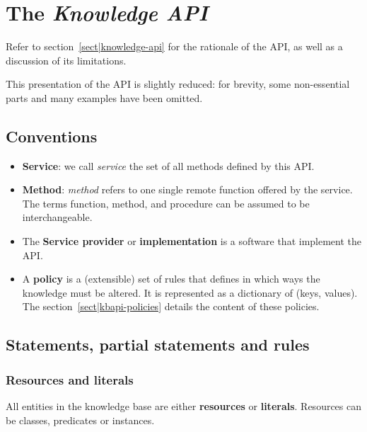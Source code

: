\chapter{The \emph{Knowledge API}}
\label{chapter|kb-api}

Refer to section~\ref{sect|knowledge-api} for the rationale of the API, as well
as a discussion of its limitations.

This presentation of the API is slightly reduced: for brevity, some
non-essential parts and many examples have been omitted.

\section{Conventions}

\begin{itemize}

    \item  \textbf{Service}: we call \emph{service} the set of all methods
    defined by this API.

    \item  \textbf{Method}: \emph{method} refers to one single remote function
    offered by the service. The terms function, method, and procedure can be
    assumed to be interchangeable.

    \item  The \textbf{Service provider} or \textbf{implementation} is a
    software that implement the API.

    \item  A \textbf{policy} is a (extensible) set of rules that defines in
    which ways the knowledge must be altered. It is represented as a dictionary
    of (keys, values). The section~\ref{sect|kbapi-policies} details the
    content of these policies.

\end{itemize}

\section{Statements, partial statements and rules}


\subsection{Resources and literals}


All entities in the knowledge base are either \textbf{resources} or
\textbf{literals}. Resources can be classes, predicates or instances.

